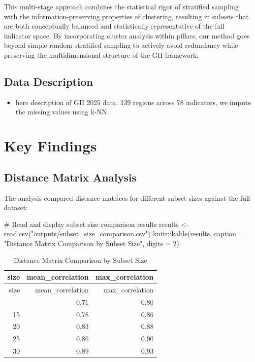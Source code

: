 \documentclass[
  letterpaper,
  DIV=11,
  numbers=noendperiod]{scrartcl}
\newenvironment{Shaded}{\begin{snugshade}}{\end{snugshade}}
\newcommand{\AttributeTok}[1]{\textcolor[rgb]{0.40,0.45,0.13}{#1}}
\newcommand{\CommentTok}[1]{\textcolor[rgb]{0.37,0.37,0.37}{#1}}
\newcommand{\DecValTok}[1]{\textcolor[rgb]{0.68,0.00,0.00}{#1}}
\newcommand{\FunctionTok}[1]{\textcolor[rgb]{0.28,0.35,0.67}{#1}}
\newcommand{\NormalTok}[1]{\textcolor[rgb]{0.00,0.23,0.31}{#1}}
\newcommand{\OtherTok}[1]{\textcolor[rgb]{0.00,0.23,0.31}{#1}}
\newcommand{\SpecialCharTok}[1]{\textcolor[rgb]{0.37,0.37,0.37}{#1}}
\newcommand{\StringTok}[1]{\textcolor[rgb]{0.13,0.47,0.30}{#1}}
\providecommand{\tightlist}{%
  \setlength{\itemsep}{0pt}\setlength{\parskip}{0pt}}
\begin{document}
This multi-stage approach combines the statistical rigor of stratified
sampling with the information-preserving properties of clustering,
resulting in subsets that are both conceptually balanced and
statistically representative of the full indicator space. By
incorporating cluster analysis within pillars, our method goes beyond
simple random stratified sampling to actively avoid redundancy while
preserving the multidimensional structure of the GII framework.

\subsection{Data Description}\label{data-description}

\begin{itemize}
\tightlist
\item
  here description of GII 2025 data. 139 regions across 78 indicators,
  we impute the missing values using k-NN.
\end{itemize}

\section{Key Findings}\label{key-findings}

\subsection{Distance Matrix Analysis}\label{distance-matrix-analysis}

The analysis compared distance matrices for different subset sizes
against the full dataset:

\begin{Shaded}
\begin{Highlighting}[]
\CommentTok{\# Read and display subset size comparison results}
\NormalTok{results }\OtherTok{\textless{}{-}} \FunctionTok{read.csv}\NormalTok{(}\StringTok{"outputs/subset\_size\_comparison.csv"}\NormalTok{)}
\NormalTok{knitr}\SpecialCharTok{::}\FunctionTok{kable}\NormalTok{(results, }\AttributeTok{caption =} \StringTok{"Distance Matrix Comparison by Subset Size"}\NormalTok{, }\AttributeTok{digits =} \DecValTok{2}\NormalTok{)}
\end{Highlighting}
\end{Shaded}

\begin{longtable}[]{@{}rrr@{}}
\caption{Distance Matrix Comparison by Subset Size}\tabularnewline
\toprule\noalign{}
size & mean\_correlation & max\_correlation \\
\midrule\noalign{}
\endfirsthead
\toprule\noalign{}
size & mean\_correlation & max\_correlation \\
\midrule\noalign{}
\endhead
\bottomrule\noalign{}
\endlastfoot
10 & 0.71 & 0.80 \\
15 & 0.78 & 0.86 \\
20 & 0.83 & 0.88 \\
25 & 0.86 & 0.90 \\
30 & 0.89 & 0.93 \\
\end{longtable}
\end{document}
